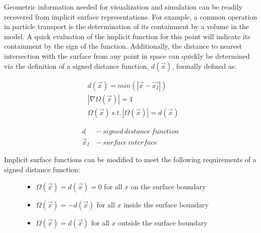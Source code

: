 Geometric information needed for visualization and simulation can be
readily recovered from implicit surface representations. For example, a common
operation in particle transport is the determination of its containment by a
volume in the model. A quick evaluation of the implicit function for this point
will indicate its containment by the sign of the function.
Additionally, the distance to nearest intersection with the surface from any
point in space can quickly be determined via the definition of a signed distance
function, $d(\vec{x})$, formally defined as:

\begin{align} \label{eq:sdf}
  & d(\vec{x}) = min(|\vec{x} - \vec{x_{I}}|) \\
  & |\nabla \Omega(\vec{x})| = 1 \\
  & \Omega(\vec{x})  \,s.t.  \,|\Omega(\vec{x})| = d(\vec{x})
\end{align}

\begin{align}
  d \, &- \, signed \, distance \, function \\
  \vec{x}_{I} \, &- \,surface \, interface
\end{align}

\noindent

Implicit surface functions can be modified to meet the following
requirements of a signed distance function:

\begin{figure}[H]
  \begin{center}
    \begin{minipage}{.8\textwidth}
      \begin{itemize}
      \item $ \Omega(\vec{x}) = d(\vec{x}) = 0 $ for all $x$ on the surface boundary
      \item $ \Omega(\vec{x}) = -d(\vec{x}) $ for all $x$ inside the surface boundary
      \item $ \Omega(\vec{x}) = d(\vec{x}) $ for all $x$ outside the surface boundary
      \end{itemize}
    \end{minipage}
  \end{center}
\end{figure}

